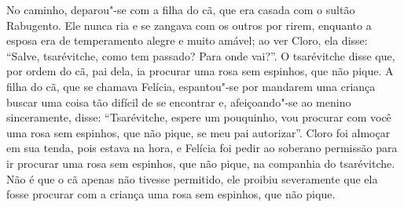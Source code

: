 No caminho, deparou"-se com a filha do cã, que era casada com o sultão
Rabugento. Ele nunca ria e se zangava com os outros por rirem, enquanto
a esposa era de temperamento alegre e muito amável; ao ver Cloro, ela
disse: ``Salve, tsarévitche, como tem passado? Para onde vai?''. O
tsarévitche disse que, por ordem do cã, pai dela, ia procurar uma rosa
sem espinhos, que não pique. A filha do cã, que se chamava Felícia,
espantou"-se por mandarem uma criança buscar uma coisa tão difícil de se
encontrar e, afeiçoando"-se ao menino sinceramente, disse: ``Tsarévitche,
espere um pouquinho, vou procurar com você uma rosa sem espinhos, que
não pique, se meu pai autorizar''. Cloro foi almoçar em sua tenda, pois
estava na hora, e Felícia foi pedir ao soberano permissão para ir
procurar uma rosa sem espinhos, que não pique, na companhia do
tsarévitche. Não é que o cã apenas não tivesse permitido, ele proibiu
severamente que ela fosse procurar com a criança uma rosa sem espinhos,
que não pique.

